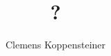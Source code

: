 \documentclass[english]{thesis}
\title{?}
\author{Clemens Koppensteiner}
\begin{document}
\frontmatter

\maketitlepage

\tableofcontents

\mainmatter





\backmatter

\printbibliography
\end{document}
